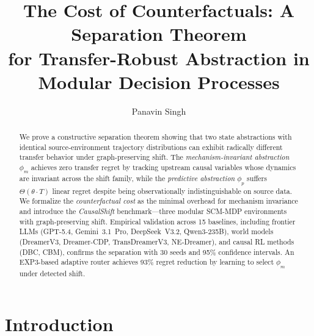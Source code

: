 \documentclass[runningheads]{llncs}
\newcommand{\phim}{\phi_m}
\newcommand{\phip}{\phi_p}
\begin{document}
\title{The Cost of Counterfactuals: A Separation Theorem\\ for Transfer-Robust Abstraction in Modular Decision Processes}

\author{Panavin Singh}



\maketitle

\begin{abstract}
We prove a constructive separation theorem showing that two state abstractions with identical source-environment trajectory distributions can exhibit radically different transfer behavior under graph-preserving shift. The \emph{mechanism-invariant abstraction} $\phim$ achieves zero transfer regret by tracking upstream causal variables whose dynamics are invariant across the shift family, while the \emph{predictive abstraction} $\phip$ suffers $\Theta(\theta \cdot T)$ linear regret despite being observationally indistinguishable on source data. We formalize the \emph{counterfactual cost} as the minimal overhead for mechanism invariance and introduce the \emph{CausalShift} benchmark---three modular SCM-MDP environments with graph-preserving shift. Empirical validation across 15 baselines, including frontier LLMs (GPT-5.4, Gemini~3.1~Pro, DeepSeek~V3.2, Qwen3-235B), world models (DreamerV3, Dreamer-CDP, TransDreamerV3, NE-Dreamer), and causal RL methods (DBC, CBM), confirms the separation with 30 seeds and 95\% confidence intervals. An EXP3-based adaptive router achieves 93\% regret reduction by learning to select $\phim$ under detected shift.

\end{abstract}

\section{Introduction}
\label{sec:intro}
\end{document}
